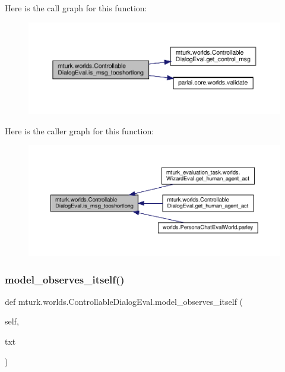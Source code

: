 Here is the call graph for this function\+:
\nopagebreak
\begin{figure}[H]
\begin{center}
\leavevmode
\includegraphics[width=350pt]{classmturk_1_1worlds_1_1ControllableDialogEval_a549992c78140c745d43874d073eb90c1_cgraph}
\end{center}
\end{figure}
Here is the caller graph for this function\+:
\nopagebreak
\begin{figure}[H]
\begin{center}
\leavevmode
\includegraphics[width=350pt]{classmturk_1_1worlds_1_1ControllableDialogEval_a549992c78140c745d43874d073eb90c1_icgraph}
\end{center}
\end{figure}
\mbox{\label{classmturk_1_1worlds_1_1ControllableDialogEval_a3e71aa36c309c8078481261ec0b4bc14}} 
\subsubsection{\texorpdfstring{model\+\_\+observes\+\_\+itself()}{model\_observes\_itself()}}
{\footnotesize\ttfamily def mturk.\+worlds.\+Controllable\+Dialog\+Eval.\+model\+\_\+observes\+\_\+itself (\begin{DoxyParamCaption}\item[{}]{self,  }\item[{}]{txt }\end{DoxyParamCaption})}



